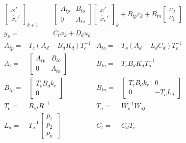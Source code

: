 \documentclass[twocolumn]{autart}    %
\newcommand{\mat}[1]{{#1}}
\renewcommand{\vec}[1]{{#1}}
\begin{document}
{\begin{align}
\left [\begin{array}{c}\vec{x}'\\ \hat{\vec{x}}_e' \end{array}\right]_{k+1}
=&\left [\begin{array}{cc}\mat{A}_{tp}&\mat{B}_{to}\\ \mat{0}&\mat{A}_{to}\end{array}\right]
\left [\begin{array}{c}\vec{x}'\\ \hat{\vec{x}}_e' \end{array}\right]_k
+\mat{B}_{tp} \vec{r}_k
+\mat{B}_{tn}\left [\begin{array}{c}\vec{\nu}_2\\ \vec{\nu}_1\end{array}\right]\nonumber\\
\vec{y}_k=&\mat{C}_{t}\vec{x}_k + \mat{D}_{d}\vec{u}_k
\label{eq:observer_LTI_cf}
\end{align}
\begin{align*}
\mat{A}_{tp}=&\mat{T}_c\left(\mat{A}_d-\mat{B}_d\mat{K}_d\right)\mat{T}_c^{-1}&
\mat{A}_{to}=&\mat{T}_o\left(\mat{A}_d-\mat{L}_d\mat{C}_d\right)\mat{T}_o^{-1}\\
\mat{A}_t=&\left [\begin{array}{cc}\mat{A}_{tp}&\mat{B}_{to}\\ \mat{0}&\mat{A}_{to}\end{array}\right]&
\mat{B}_{to}=&\mat{T}_c\mat{B}_d\mat{K}_d\mat{T}_o^{-1}\\
\mat{B}_{tp}=&\left[\begin{array}{c}\mat{T}_c\mat{B}_d\mat{k}_r\\\mat{0}\end{array}\right]&
\mat{B}_{tn}=&\left[\begin{array}{cc}\mat{T}_c\mat{B}_d\mat{k}_r&\mat{0}\\\mat{0}&-\mat{T}_o\mat{L}_d\end{array}\right]\\
\mat{T}_с=&\mat{R}_{cf}\mat{R}^{-1}&
\mat{T}_o=&\mat{W}_o^{-1}\mat{W}_{of}\\
\mat{L}_d=& \mat{T}_o^{-1}\left[ \begin{array}{c}p_1\\p_2\\p_n\end{array}\right]&
\mat{C}_t=&\mat{C}_d\mat{T}_c
\end{align*}

}
\end{document}
